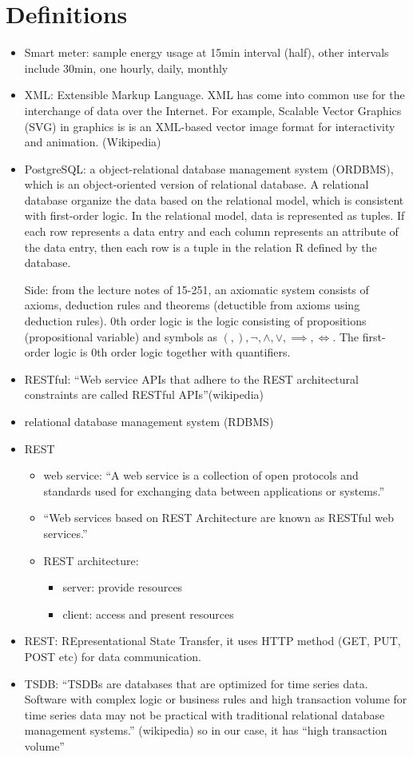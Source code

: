 \documentclass[hidelinks,12pt]{article}
\begin{document}
\section{Definitions}
\begin{itemize}
\item Smart meter: sample energy usage at 15min interval (half), other
  intervals include 30min, one hourly, daily, monthly
\item XML: Extensible Markup Language. XML has come into common use
  for the interchange of data over the Internet. For example, Scalable
  Vector Graphics (SVG) in graphics is is an XML-based vector image
  format for interactivity and animation. (Wikipedia)
\item PostgreSQL: a object-relational database management system
  (ORDBMS), which is an object-oriented version of relational
  database. A relational database organize the data based on the
  relational model, which is consistent with first-order logic. In the
  relational model, data is represented as tuples. If each row
  represents a data entry and each column represents an attribute of
  the data entry, then each row is a tuple in the relation R defined
  by the database.

  Side: from the lecture notes of 15-251, an axiomatic system consists
  of axioms, deduction rules and theorems (detuctible from axioms
  using deduction rules). 0th order logic is the logic consisting of
  propositions (propositional variable) and symbols as
  $(, ), \neg, \land, \lor, \implies, \iff$. The first-order logic is
  0th order logic together with quantifiers.

\item RESTful: ``Web service APIs that adhere to the REST architectural
  constraints are called RESTful APIs''(wikipedia)
\item relational database management system (RDBMS)
\item REST
  \begin{itemize}
  \item web service: ``A web service is a collection of open protocols
    and standards used for exchanging data between applications or
    systems.''~\cite{REST2015}
  \item ``Web services based on REST Architecture are known as RESTful
    web services.''~\cite{REST2015}
  \item REST architecture: 
    \begin{itemize}
    \item server: provide resources
    \item client: access and present resources
    \end{itemize}
  \end{itemize}
\item REST: REpresentational State Transfer, it uses HTTP method (GET,
  PUT, POST etc) for data communication.
\item TSDB: ``TSDBs are databases that are optimized for time series
  data. Software with complex logic or business rules and high
  transaction volume for time series data may not be practical with
  traditional relational database management systems.'' (wikipedia) so
  in our case, it has ``high transaction volume''
  

\end{itemize}
\end{document}
